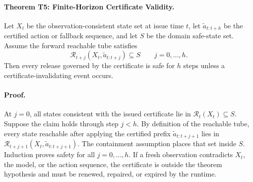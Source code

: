\paragraph{Theorem T5: Finite-Horizon Certificate Validity.}
Let \(X_t\) be the observation-consistent state set at issue time \(t\), let
\(\tilde a_{t:t+h}\) be the certified action or fallback sequence, and let
\(S\) be the domain safe-state set. Assume the forward reachable tube satisfies
\[
  \mathcal R_{t+j}(X_t,\tilde a_{t:t+j}) \subseteq S
  \qquad j=0,\ldots,h .
\]
Then every release governed by the certificate is safe for \(h\) steps unless a
certificate-invalidating event occurs.

\paragraph{Proof.}
At \(j=0\), all states consistent with the issued certificate lie in
\(\mathcal R_t(X_t)\subseteq S\). Suppose the claim holds through step \(j<h\).
By definition of the reachable tube, every state reachable after applying the
certified prefix \(\tilde a_{t:t+j+1}\) lies in
\(\mathcal R_{t+j+1}(X_t,\tilde a_{t:t+j+1})\). The containment assumption places
that set inside \(S\). Induction proves safety for all \(j=0,\ldots,h\). If a
fresh observation contradicts \(X_t\), the model, or the action sequence, the
certificate is outside the theorem hypothesis and must be renewed, repaired, or
expired by the runtime.
